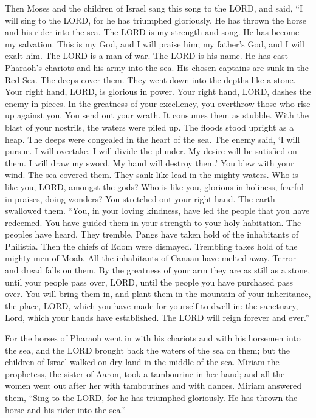  Then Moses and the children of Israel sang this song to the
LORD, and said, ``I will sing to the LORD, for he has triumphed
gloriously. He has thrown the horse and his rider into the sea.
 The LORD is my strength and song. He has become my
salvation. This is my God, and I will praise him; my father's God, and I
will exalt him.  The LORD is a man of war. The LORD is his
name.  He has cast Pharaoh's chariots and his army into the
sea. His chosen captains are sunk in the Red Sea.  The deeps
cover them. They went down into the depths like a stone. 
Your right hand, LORD, is glorious in power. Your right hand, LORD,
dashes the enemy in pieces.  In the greatness of your
excellency, you overthrow those who rise up against you. You send out
your wrath. It consumes them as stubble.  With the blast of
your nostrils, the waters were piled up. The floods stood upright as a
heap. The deeps were congealed in the heart of the sea.  The
enemy said, `I will pursue. I will overtake. I will divide the plunder.
My desire will be satisfied on them. I will draw my sword. My hand will
destroy them.'  You blew with your wind. The sea covered
them. They sank like lead in the mighty waters.  Who is
like you, LORD, amongst the gods? Who is like you, glorious in holiness,
fearful in praises, doing wonders?  You stretched out your
right hand. The earth swallowed them.  ``You, in your
loving kindness, have led the people that you have redeemed. You have
guided them in your strength to your holy habitation.  The
peoples have heard. They tremble. Pangs have taken hold of the
inhabitants of Philistia.  Then the chiefs of Edom were
dismayed. Trembling takes hold of the mighty men of Moab. All the
inhabitants of Canaan have melted away.  Terror and dread
falls on them. By the greatness of your arm they are as still as a
stone, until your people pass over, LORD, until the people you have
purchased pass over.  You will bring them in, and plant
them in the mountain of your inheritance, the place, LORD, which you
have made for yourself to dwell in: the sanctuary, Lord, which your
hands have established.  The LORD will reign forever and
ever.''

 For the horses of Pharaoh went in with his chariots and
with his horsemen into the sea, and the LORD brought back the waters of
the sea on them; but the children of Israel walked on dry land in the
middle of the sea.  Miriam the prophetess, the sister of
Aaron, took a tambourine in her hand; and all the women went out after
her with tambourines and with dances.  Miriam answered
them, ``Sing to the LORD, for he has triumphed gloriously. He has thrown
the horse and his rider into the sea.''


